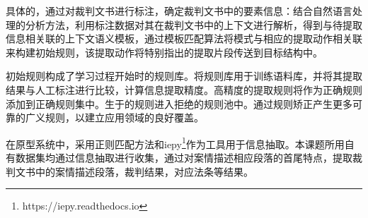 具体的，通过对裁判文书进行标注，确定裁判文书中的要素信息：结合自然语言处理的分析方法，利用标注数据对其在裁判文书中的上下文进行解析，得到与待提取信息相关联的上下文语义模板，通过模板匹配算法将模式与相应的提取动作相关联来构建初始规则，该提取动作将特别指出的提取片段传送到目标结构中。

初始规则构成了学习过程开始时的规则库。将规则库用于训练语料库，并将其提取结果与人工标注进行比较，计算信息提取精度。高精度的提取规则将作为正确规则添加到正确规则集中。生于的规则进入拒绝的规则池中。通过规则矫正产生更多可靠的广义规则，以建立应用领域的良好覆盖。

在原型系统中，采用正则匹配方法和iepy\footnote{https://iepy.readthedocs.io}作为工具用于信息抽取。本课题所用自有数据集均通过信息抽取进行收集，通过对案情描述相应段落的首尾特点，提取裁判文书中的案情描述段落，裁判结果，对应法条等结果。






